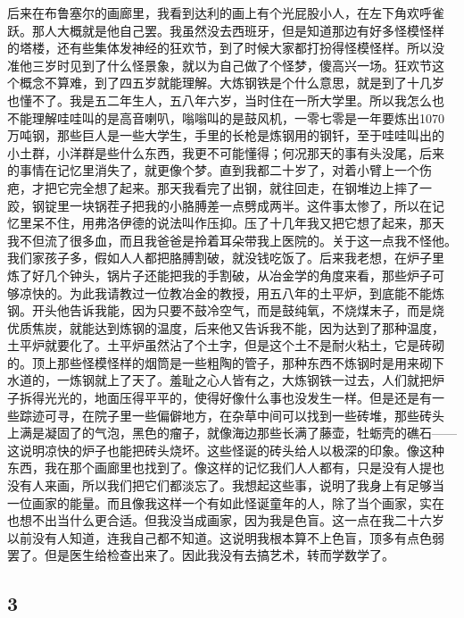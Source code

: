 后来在布鲁塞尔的画廊里，我看到达利的画上有个光屁股小人，在左下角欢呼雀
跃。那人大概就是他自己罢。我虽然没去西班牙，但是知道那边有好多怪模怪样
的塔楼，还有些集体发神经的狂欢节，到了时候大家都打扮得怪模怪样。所以没
准他三岁时见到了什么怪景象，就以为自己做了个怪梦，傻高兴一场。狂欢节这
个概念不算难，到了四五岁就能理解。大炼钢铁是个什么意思，就是到了十几岁
也懂不了。我是五二年生人，五八年六岁，当时住在一所大学里。所以我怎么也
不能理解哇哇叫的是高音喇叭，嗡嗡叫的是鼓风机，一零七零是一年要炼出1070
万吨钢，那些巨人是一些大学生，手里的长枪是炼钢用的钢钎，至于哇哇叫出的
小土群，小洋群是些什么东西，我更不可能懂得；何况那天的事有头没尾，后来
的事情在记忆里消失了，就更像个梦。直到我都二十岁了，对着小臂上一个伤
疤，才把它完全想了起来。那天我看完了出钢，就往回走，在钢堆边上摔了一
跤，钢锭里一块锅茬子把我的小胳膊差一点劈成两半。这件事太惨了，所以在记
忆里呆不住，用弗洛伊德的说法叫作压抑。压了十几年我又把它想了起来，那天
我不但流了很多血，而且我爸爸是拎着耳朵带我上医院的。关于这一点我不怪他。
我们家孩子多，假如人人都把胳膊割破，就没钱吃饭了。后来我老想，在炉子里
炼了好几个钟头，锅片子还能把我的手割破，从冶金学的角度来看，那些炉子可
够凉快的。为此我请教过一位教冶金的教授，用五八年的土平炉，到底能不能炼
钢。开头他告诉我能，因为只要不鼓冷空气，而是鼓纯氧，不烧煤末子，而是烧
优质焦炭，就能达到炼钢的温度，后来他又告诉我不能，因为达到了那种温度，
土平炉就要化了。土平炉虽然沾了个土字，但是这个土不是耐火粘土，它是砖砌
的。顶上那些怪模怪样的烟筒是一些粗陶的管子，那种东西不炼钢时是用来砌下
水道的，一炼钢就上了天了。羞耻之心人皆有之，大炼钢铁一过去，人们就把炉
子拆得光光的，地面压得平平的，使得好像什么事也没发生一样。但是还是有一
些踪迹可寻，在院子里一些偏僻地方，在杂草中间可以找到一些砖堆，那些砖头
上满是凝固了的气泡，黑色的瘤子，就像海边那些长满了藤壶，牡蛎壳的礁石——
这说明凉快的炉子也能把砖头烧坏。这些怪诞的砖头给人以极深的印象。像这种
东西，我在那个画廊里也找到了。像这样的记忆我们人人都有，只是没有人提也
没有人来画，所以我们把它们都淡忘了。我想起这些事，说明了我身上有足够当
一位画家的能量。而且像我这样一个有如此怪诞童年的人，除了当个画家，实在
也想不出当什么更合适。但我没当成画家，因为我是色盲。这一点在我二十六岁
以前没有人知道，连我自己都不知道。这说明我根本算不上色盲，顶多有点色弱
罢了。但是医生给检查出来了。因此我没有去搞艺术，转而学数学了。

\subsection{3} 

